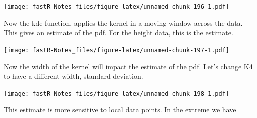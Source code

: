 \documentclass[]{book}
\newenvironment{Shaded}{\begin{snugshade}}{\end{snugshade}}
\newcommand{\KeywordTok}[1]{\textcolor[rgb]{0.13,0.29,0.53}{\textbf{#1}}}
\newcommand{\DataTypeTok}[1]{\textcolor[rgb]{0.13,0.29,0.53}{#1}}
\newcommand{\DecValTok}[1]{\textcolor[rgb]{0.00,0.00,0.81}{#1}}
\newcommand{\StringTok}[1]{\textcolor[rgb]{0.31,0.60,0.02}{#1}}
\newcommand{\OperatorTok}[1]{\textcolor[rgb]{0.81,0.36,0.00}{\textbf{#1}}}
\newcommand{\NormalTok}[1]{#1}
\theoremstyle{definition}
\theoremstyle{definition}
\theoremstyle{definition}
\theoremstyle{remark}
\begin{document}
\texttt{[image: fastR-Notes\_files/figure-latex/unnamed-chunk-196-1.pdf]}

Now the kde function, applies the kernel in a moving window across the
data. This gives an estimate of the pdf. For the height data, this is
the estimate.

\begin{Shaded}
\end{Shaded}

\texttt{[image: fastR-Notes\_files/figure-latex/unnamed-chunk-197-1.pdf]}

Now the width of the kernel will impact the estimate of the pdf. Let's
change K4 to have a different width, standard deviation.

\begin{Shaded}
\end{Shaded}

\texttt{[image: fastR-Notes\_files/figure-latex/unnamed-chunk-198-1.pdf]}

This estimate is more sensitive to local data points. In the extreme we
have
\end{document}
